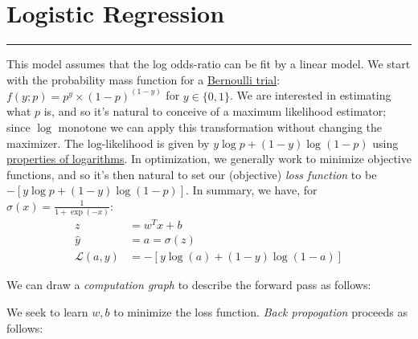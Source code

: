 \documentclass[12pt]{article}
\begin{document}
\renewcommand{\d}[1]{\ensuremath{\operatorname{d}\!{#1}}}

\tableofcontents
\newpage
\section{Logistic Regression}\vspace{.1pt} \hrule height 2pt \smallskip \renewcommand{\arraystretch}{1}%
This model assumes that the log odds-ratio can be fit by a linear model. We start with the probability mass function for a \href{https://en.wikipedia.org/wiki/Bernoulli_distribution}{Bernoulli trial}: $f(y;p) = p^y \times (1-p)^{(1-y)}$ for $y \in \{0, 1\}$. We are interested in estimating what $p$ is, and so it's natural to conceive of a maximum likelihood estimator; since $\log$ monotone we can apply this transformation without changing the maximizer. The log-likelihood is given by $y \log p + (1-y) \log (1-p)$ using \href{https://en.wikipedia.org/wiki/Logarithm#Logarithmic_identities}{properties of logarithms}. In optimization, we generally work to minimize objective functions, and so it's then natural to set our (objective) \emph{loss function}
to be $- \left[y \log p + (1-y) \log (1-p)\right]$. In summary, we 
have, for $\sigma(x) = \frac{1}{1 + \exp(-x)}$:
\begin{align}
  z &= w^Tx + b \\
  \hat y &= a = \sigma(z) \\
  \mathcal{L}(a, y) &= - \left[y \log (a) + (1-y) \log (1-a)\right] \end{align}

We can draw a \emph{computation graph} to describe the forward pass as follows:
\begin{center}
\end{center} We seek to learn $w, b$ to minimize the loss function. \emph{Back propogation} proceeds as follows:
\end{document}
